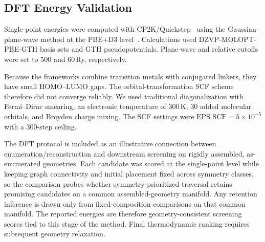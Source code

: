 \documentclass[pdflatex,sn-mathphys-num]{sn-jnl}
\theoremstyle{thmstyleone}%
\begin{document}
\subsection*{DFT Energy Validation}
Single-point energies were computed with CP2K/Quickstep~\cite{cp2k2020} using the Gaussian--plane-wave method at the PBE+D3 level~\cite{perdew1996pbe,grimme2010d3}. Calculations used DZVP-MOLOPT-PBE-GTH basis sets and GTH pseudopotentials. Plane-wave and relative cutoffs were set to 500 and 60\,Ry, respectively.

Because the frameworks combine transition metals with conjugated linkers, they have small HOMO--LUMO gaps. The orbital-transformation SCF scheme therefore did not converge reliably. We used traditional diagonalization with Fermi--Dirac smearing, an electronic temperature of 300\,K, 30 added molecular orbitals, and Broyden charge mixing. The SCF settings were $\mathrm{EPS\_SCF}=5\times10^{-5}$ with a 300-step ceiling.

The DFT protocol is included as an illustrative connection between enumeration/reconstruction and downstream screening on rigidly assembled, as-enumerated geometries. Each candidate was scored at the single-point level while keeping graph connectivity and initial placement fixed across symmetry classes, so the comparison probes whether symmetry-prioritized traversal retains promising candidates on a common assembled-geometry manifold. Any retention inference is drawn only from fixed-composition comparisons on that common manifold. The reported energies are therefore geometry-consistent screening scores tied to this stage of the method. Final thermodynamic ranking requires subsequent geometry relaxation.
\end{document}

